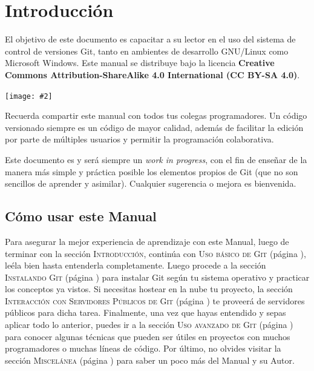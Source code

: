 \documentclass{article}
\begin{document}
\tableofcontents
\pagebreak

\setlength{\parindent}{4em}
\setlength{\parskip}{1em}

\newcommand{\imagen}[2]{
    \begin{center}
    \noindent \texttt{[image: \#2]}
    \end{center}
}

\section{Introducción}

El objetivo de este documento es capacitar a su lector en el uso del sistema de control de versiones Git, tanto en ambientes de desarrollo GNU/Linux como Microsoft Windows. Este manual se distribuye bajo la licencia \textbf{Creative Commons Attribution-ShareAlike 4.0 International (CC BY-SA 4.0)}.

\imagen{width=3cm}{logos/CC-BY-SA.png}

Recuerda compartir este manual con todos tus colegas programadores. Un código versionado siempre es un código de mayor calidad, además de facilitar la edición por parte de múltiples usuarios y permitir la programación colaborativa.

Este documento es y será siempre un \textit{work in progress}, con el fin de enseñar de la manera más simple y práctica posible los elementos propios de Git (que no son sencillos de aprender y asimilar). Cualquier sugerencia o mejora es bienvenida.

\subsection{Cómo usar este Manual}

Para asegurar la mejor experiencia de aprendizaje con este Manual, luego de terminar con la sección \textsc{Introducción}, continúa con \textsc{Uso básico de Git} (página \pageref{basic}), leéla bien hasta entenderla completamente. Luego procede a la sección \textsc{Instalando Git} (página \pageref{install}) para instalar Git según tu sistema operativo y practicar los conceptos ya vistos. Si necesitas hostear en la nube tu proyecto, la sección \textsc{Interacción con Servidores Públicos de Git} (página \pageref{host}) te proveerá de servidores públicos para dicha tarea. Finalmente, una vez que hayas entendido y sepas aplicar todo lo anterior, puedes ir a la sección \textsc{Uso avanzado de Git} (página \pageref{adv}) para conocer algunas técnicas que pueden ser útiles en proyectos con muchos programadores o muchas líneas de código. Por último, no olvides visitar la sección \textsc{Miscelánea} (página \pageref{misc}) para saber un poco más del Manual y su Autor.
\end{document}
